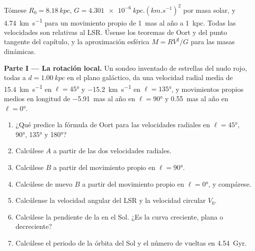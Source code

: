 \begin{problem}
\label{pb:b3:milky-way-galaxies:1}
Tómese $R_0 = \qty{8.18}{kpc}$, $G = \qty{4.301e-6}{kpc.(km.s^{-1})^2}$ por
masa solar, y \qty{4.74}{km.s^{-1}} para un movimiento propio de
\qty{1}{mas} al año a \qty{1}{kpc}. Todas las velocidades son relativas al
LSR. Úsense los teoremas de Oort y del punto tangente del capítulo, y la
aproximación esférica $M = RV^2/G$ para las masas dinámicas.

\medskip\noindent\textbf{Parte I --- La rotación local.} Un sondeo inventado
de estrellas del nudo rojo, todas a $d = \qty{1.00}{kpc}$ en el plano galáctico,
da una velocidad radial media de \qty{+15.4}{km.s^{-1}} en
$\ell = \ang{45}$ y \qty{-15.2}{km.s^{-1}} en $\ell = \ang{135}$, y
movimientos propios medios en longitud de \qty{-5.91}{mas} al año en
$\ell = \ang{90}$ y \qty{+0.55}{mas} al año en $\ell = \ang{0}$.
\begin{enumerate}
\item ¿Qué predice la fórmula de Oort para las velocidades radiales en
  $\ell = \ang{45}$, \ang{90}, \ang{135} y \ang{180}?
\item Calcúlese $A$ a partir de las dos velocidades radiales.
\item Calcúlese $B$ a partir del movimiento propio en $\ell = \ang{90}$.
\item Calcúlese de nuevo $B$ a partir del movimiento propio en $\ell = \ang{0}$, y
  compárese.
\item Calcúlense la velocidad angular del LSR y la velocidad circular
  $V_0$.
\item Calcúlese la pendiente de la  en el Sol. ¿Es la curva
  creciente, plana o decreciente?
\item Calcúlese el periodo de la órbita del Sol y el número de vueltas en
  \qty{4.54}{Gyr}.
\end{enumerate}


\end{problem}
